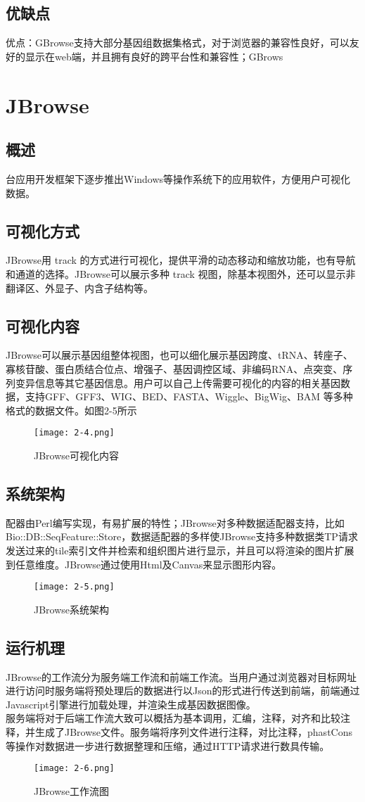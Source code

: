 		\subsection{优缺点}
		优点：GBrowse支持大部分基因组数据集格式，对于浏览器的兼容性良好，可以友好的显示在web端，并且拥有良好的跨平台性和兼容性；GBrows
	\section{JBrowse}
		\subsection{概述}
	台应用开发框架下逐步推出Windows等操作系统下的应用软件，方便用户可视化数据。
		\subsection{可视化方式}
		JBrowse用 track 的方式进行可视化，提供平滑的动态移动和缩放功能，也有导航和通道的选择。JBrowse可以展示多种 track 视图，除基本视图外，还可以显示非翻译区、外显子、内含子结构等。
		
		\subsection{可视化内容}
		JBrowse可以展示基因组整体视图，也可以细化展示基因跨度、tRNA、转座子、寡核苷酸、蛋白质结合位点、增强子、基因调控区域、非编码RNA、点突变、序列变异信息等其它基因信息。用户可以自己上传需要可视化的内容的相关基因数据，支持GFF、GFF3、WIG、BED、FASTA、Wiggle、BigWig、BAM 等多种格式的数据文件。如图2-5所示
		\begin{figure}[!ht]
			\centering
			\texttt{[image: 2-4.png]}
			\caption{JBrowse可视化内容}
		\end{figure}
		\subsection{系统架构}
配器由Perl编写实现，有易扩展的特性；JBrowse对多种数据适配器支持，比如Bio::DB::SeqFeature::Store，数据适配器的多样使JBrowse支持多种数据类TP请求发送过来的tile索引文件并检索和组织图片进行显示，并且可以将渲染的图片扩展到任意维度。JBrowse通过使用Html及Canvas来显示图形内容。
		\begin{figure}[!ht]
			\centering
			\texttt{[image: 2-5.png]}
			\caption{JBrowse系统架构}
		\end{figure}
		\subsection{运行机理}
		JBrowse的工作流分为服务端工作流和前端工作流。当用户通过浏览器对目标网址进行访问时服务端将预处理后的数据进行以Json的形式进行传送到前端，前端通过Javascript引擎进行加载处理，并渲染生成基因数据图像。\\
		\indent 服务端将对于后端工作流大致可以概括为基本调用，汇编，注释，对齐和比较注释，并生成了JBrowse文件。服务端将序列文件进行注释，对比注释，phastCons等操作对数据进一步进行数据整理和压缩，通过HTTP请求进行数具传输。
		\begin{figure}[!ht]
			\centering
			\texttt{[image: 2-6.png]}
			\caption{JBrowse工作流图}
		\end{figure}
